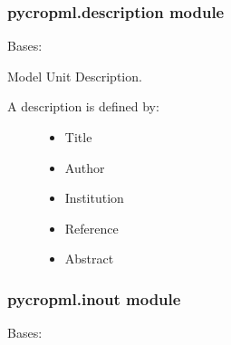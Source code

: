 \documentclass[letterpaper,10pt,english]{sphinxmanual}
\begin{document}
\subsubsection{pycropml.description module}
\label{\detokenize{_dvlpt/pycropml:pycropml-description-module}}\label{\detokenize{_dvlpt/pycropml:module-pycropml.description}}

\begin{fulllineitems}
\label{\detokenize{_dvlpt/pycropml:pycropml.description.Description}}
Bases: 

Model Unit Description.
\begin{description}
\item[{A description is defined by:}] \leavevmode\begin{itemize}
\item {} 
Title

\item {} 
Author

\item {} 
Institution

\item {} 
Reference

\item {} 
Abstract

\end{itemize}

\end{description}

\end{fulllineitems}



\subsubsection{pycropml.inout module}
\label{\detokenize{_dvlpt/pycropml:pycropml-inout-module}}\label{\detokenize{_dvlpt/pycropml:module-pycropml.inout}}

\begin{fulllineitems}
\label{\detokenize{_dvlpt/pycropml:pycropml.inout.Input}}
Bases: {\hyperref[\detokenize{_dvlpt/pycropml:pycropml.inout.InputOutput}]{}}

\end{fulllineitems}
\end{document}
